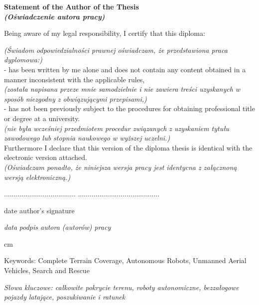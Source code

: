 \begin{center}
\Large \textbf{Statement of the Author of the Thesis \\ \emph{(Oświadczenie autora pracy)}}
\end{center}
\vskip 0.5cm
\normalsize
Being aware of my legal responsibility, I certify that this diploma:

\emph{(Świadom odpowiedzialności prawnej oświadczam, że przedstawiona praca dyplomowa:)} \\

- has been written by me alone and does not contain any content obtained in a
manner inconsistent with the applicable rules, \\
\emph{(została napisana przeze mnie samodzielnie i nie zawiera treści uzyskanych w sposób niezgodny z obwiązującymi przepisami,)}\\

- has not been previously subject to the procedures for obtaining professional
title or degree at a university. \\
\emph{(nie była wcześniej przedmiotem procedur związanych z uzyskaniem tytułu zawodowego lub stopnia naukowego w wyższej uczelni.)} \\

Furthermore I declare that this version of the diploma thesis is identical with
the electronic version attached. \\
\emph{(Oświadczam ponadto, że niniejsza wersja pracy jest identycna z załącznoną wersją elektroniczną.)}

\vskip 2cm

..................................... \hfill ..........................................

\hspace{1.5cm} date   \hspace{7.4cm} author's signature

\hspace{1.5cm} \emph{data}   \hspace{6.3cm} \emph{podpis autora (autorów) pracy}

 cm

Keywords: Complete Terrain Coverage, Autonomous Robots, Unmanned Aerial Vehicles, Search and Rescue

\emph{Słowa kluczowe: całkowite pokrycie terenu, roboty autonomiczne, bezzałogowe pojazdy latające, poszukiwanie i ratunek}

\clearpage
